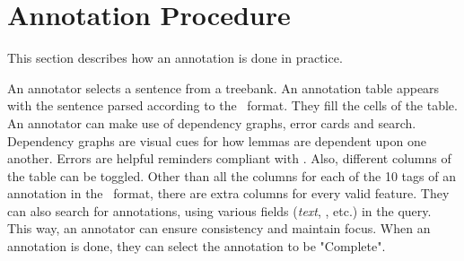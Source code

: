 \section{Annotation Procedure}
\label{sec:annotation}
This section describes how an annotation is done in practice.

An annotator selects a sentence from a treebank.
An annotation table appears with the sentence parsed according to the \ud\ format.
They fill the cells of the table.
An annotator can make use of dependency graphs, error cards and search.
Dependency graphs are visual cues for how lemmas are dependent upon one another.
Errors are helpful reminders compliant with \ud.
Also, different columns of the table can be toggled.
Other than all the columns for each of the 10 tags of an annotation in the \conllu\ format, there are extra columns for every valid feature.
They can also search for annotations, using various fields (\textit{text}, \feats, etc.) in the query.
This way, an annotator can ensure consistency and maintain focus.
When an annotation is done, they can select the annotation to be "Complete".

